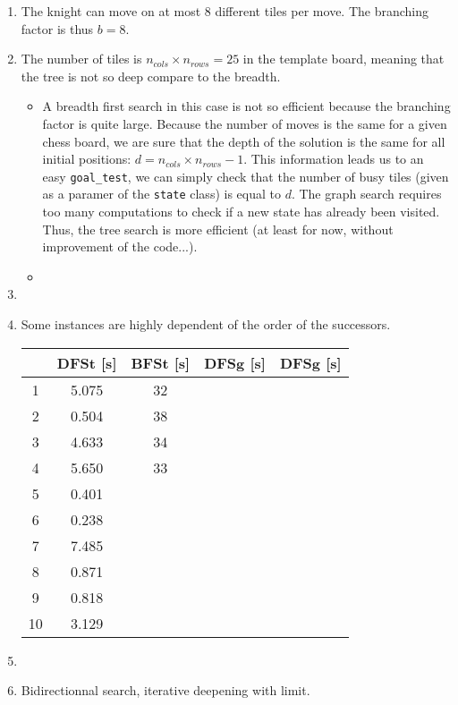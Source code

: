 \documentclass[a4paper,10pt]{article}
\newcommand{\py}[1]{\texttt{#1}}
\begin{document}
\begin{enumerate}
 \item The knight can move on at most 8 different tiles per move. The branching factor is thus $b = 8$.
 \item The number of tiles is $n_{cols} \times n_{rows} = 25$ in the template board, meaning that the tree is not so deep compare to the breadth.
 \begin{itemize}
  \item A breadth first search in this case is not so efficient because the branching factor is quite large. Because the number of moves is the same for a given chess board, we are sure that the depth of the solution is the same for all initial positions: $d = n_{cols} \times n_{rows} - 1$. This information leads us to an easy \py{goal_test}, we can simply check that the number of busy tiles (given as a paramer of the \py{state} class) is equal to $d$. The graph search requires too many computations to check if a new state has already been visited. Thus, the tree search is more efficient (at least for now, without improvement of the code...).
  \item 
 \end{itemize}
 \item 
 \item Some instances are highly dependent of the order of the successors.
 
 

\begin{center}
\begin{tabular}{ |c|c|c|c|c| } 
 \hline
  & DFSt [s] & BFSt [s] & DFSg [s] & DFSg [s]\\
 \hline 
 1 & 5.075 & 32 & & \\ 
 \hline 
 2 & 0.504 & 38 & & \\ 
 \hline 
 3 & 4.633 & 34 & & \\ 
 \hline 
 4 & 5.650 & 33 & & \\ 
 \hline 
 5 & 0.401 & & & \\ 
 \hline 
 6 & 0.238 & & & \\ 
 \hline 
 7 & 7.485 & & & \\ 
 \hline 
 8 & 0.871 & & & \\ 
 \hline 
 9 & 0.818 & & & \\ 
 \hline 
 10 & 3.129 & & & \\ 
 \hline
\end{tabular}
\end{center}



 \item 
 \item Bidirectionnal search, iterative deepening with limit.
\end{enumerate}
\end{document}
